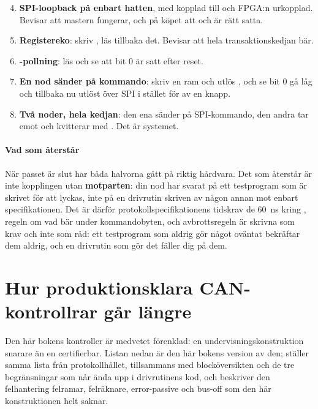 \begin{enumerate}
  \setcounter{enumi}{3}
  \item \textbf{SPI-loopback på enbart hatten}, med  kopplad till  och FPGA:n
    urkopplad. Bevisar att mastern fungerar, och på köpet att  och  är
    rätt satta.
  \item \textbf{Registereko}: skriv , läs tillbaka det. Bevisar att hela
    transaktionskedjan bär.
  \item \textbf{-pollning}: läs  och se att bit 0 är satt efter reset.
  \item \textbf{En nod sänder på kommando}: skriv en ram och utlös , och se
     bit 0 gå låg och tillbaka \textemdash{} nu utlöst över SPI i stället för av en
    knapp.
  \item \textbf{Två noder, hela kedjan}: den ena sänder på SPI-kommando, den andra tar emot och
    kvitterar med . Det är systemet.
\end{enumerate}

\paragraph{Vad som återstår}
När passet är slut har båda halvorna gått på riktig hårdvara. Det som återstår är inte kopplingen
utan \textbf{motparten}: din nod har svarat på ett testprogram som är skrivet för att lyckas, inte på
en drivrutin skriven av någon annan mot enbart specifikationen. Det är därför
protokollspecifikationens tidskrav \textemdash{} de 60~ns kring , regeln om vad 
bär under kommandobyten, och avbrottsregeln \textemdash{} är skrivna som krav och inte som råd: ett
testprogram som aldrig gör något oväntat bekräftar dem aldrig, och en drivrutin som gör det fäller dig
på dem.

\section{Hur produktionsklara CAN-kontrollrar går längre}
\label{c19:sec:gaps}

Den här bokens kontroller är medvetet förenklad: en undervisningskonstruktion snarare än en
certifierbar. Listan nedan är den här bokens version av den;  ställer samma lista från
protokollhållet, tillsammans med blocköversikten och de tre begränsningar som når ända upp i
drivrutinens kod, och  beskriver den felhantering \textemdash{} felramar, felräknare,
error-passive och bus-off \textemdash{} som den här konstruktionen helt saknar.

